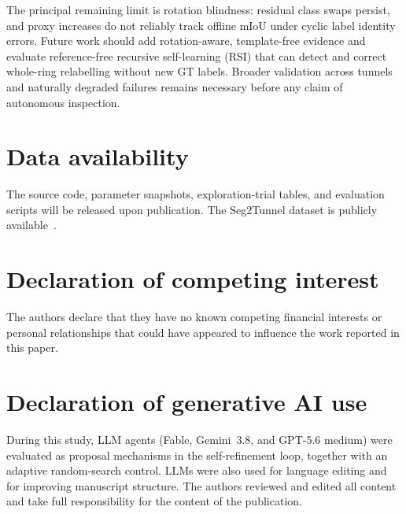 \documentclass[a4paper,fleqn]{cas-dc}
\begin{document}
{The principal remaining limit is rotation blindness: residual class swaps persist, and proxy increases do not reliably track offline mIoU under cyclic label identity errors. Future work should add rotation-aware, template-free evidence and evaluate reference-free recursive self-learning (RSI) that can detect and correct whole-ring relabelling without new GT labels. Broader validation across tunnels and naturally degraded failures remains necessary before any claim of autonomous inspection.


\section*{Data availability}

The source code, parameter snapshots, exploration-trial tables, and evaluation scripts will be released upon publication. The Seg2Tunnel dataset is publicly available~\cite{lin2024seg2tunnel}.

\section*{Declaration of competing interest}

The authors declare that they have no known competing financial interests or personal relationships that could have appeared to influence the work reported in this paper.

\section*{Declaration of generative AI use}

During this study, LLM agents (Fable, Gemini~3.8, and GPT-5.6 medium) were evaluated as proposal mechanisms in the self-refinement loop, together with an adaptive random-search control. LLMs were also used for language editing and for improving manuscript structure. The authors reviewed and edited all content and take full responsibility for the content of the publication.






}
\end{document}

